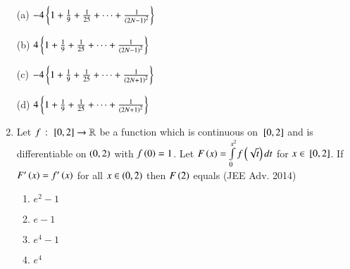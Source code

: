 \documentclass[journal,12pt,twocolumn]{IEEEtran}
\theoremstyle{remark}
\begin{document}
\begin{enumerate}
(a) $-4 \left\{1+\frac{1}{9}+\frac{1}{25}+\dots+\frac{1}{\left(2N-1\right)^{2}}\right\}$

(b) $4\left\{1+\frac{1}{9}+\frac{1}{25}+\dots+\frac{1}{\left(2N-1\right)^{2}}\right\}$

(c) $-4\left\{1+\frac{1}{9}+\frac{1}{25}+\dots+\frac{1}{\left(2N+1\right)^{2}}\right\}$

(d) $4\left\{1+\frac{1}{9}+\frac{1}{25}+\dots+\frac{1}{\left(2N+1\right)^{2}}\right\}$

\item[10)]
Let $f\,:\,{}\left[0,2\right]\to\mathbb{R}$ be a function which is continuous on ${}\left[0,2\right]$ and is differentiable on $\left(0,2\right)$ with $f\left(0\right)=1$. Let $F\left(x\right)=\int \limits_{0}^{x^{2}}f\left(\sqrt{t}\right)dt$ for $x\in{}\left[0,2\right]$. If $F^{\prime}\left(x\right)=f^{\prime}\left(x\right)$ for all ${x\in\left(0,2\right)}$ then $F\left(2\right)$ equals \hfill{(JEE Adv. 2014)}

\begin{multicols}{2}
\begin{enumerate}
\item[(a)]$e^{2}-1$
\item[(c)]$e-1$
\item[(b)]$e^{4}-1$
\item[(d)]$e^{4}$
\end{enumerate} 
\end{multicols}
\end{enumerate}

\end{document}
